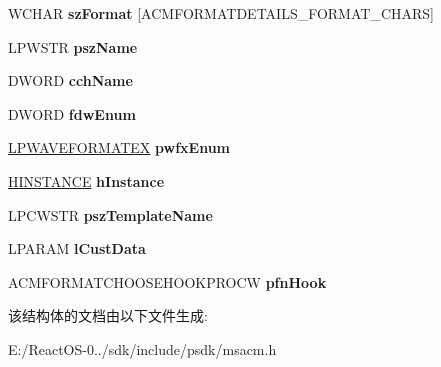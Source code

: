 \begin{DoxyCompactItemize}
\item 
\mbox{\label{struct___a_c_m_f_o_r_m_a_t_c_h_o_o_s_e_w_ac8407bab4bd26411f001b9dc2709d026}} 
W\+C\+H\+AR {\bfseries sz\+Format} \mbox{[}A\+C\+M\+F\+O\+R\+M\+A\+T\+D\+E\+T\+A\+I\+L\+S\+\_\+\+F\+O\+R\+M\+A\+T\+\_\+\+C\+H\+A\+RS\mbox{]}
\item 
\mbox{\label{struct___a_c_m_f_o_r_m_a_t_c_h_o_o_s_e_w_ac8a4c0ca80f4e1b0215f174971ca7a0c}} 
L\+P\+W\+S\+TR {\bfseries psz\+Name}
\item 
\mbox{\label{struct___a_c_m_f_o_r_m_a_t_c_h_o_o_s_e_w_a0300a30ed6baaaa1cc092c3c4b15e587}} 
D\+W\+O\+RD {\bfseries cch\+Name}
\item 
\mbox{\label{struct___a_c_m_f_o_r_m_a_t_c_h_o_o_s_e_w_a6c472a425c54b1029b259d9f210a0ca2}} 
D\+W\+O\+RD {\bfseries fdw\+Enum}
\item 
\mbox{\label{struct___a_c_m_f_o_r_m_a_t_c_h_o_o_s_e_w_a958f41f999422e0586e11bd8d8282d05}} 
\hyperlink{struct___w_a_v_e_f_o_r_m_a_t_e_x}{L\+P\+W\+A\+V\+E\+F\+O\+R\+M\+A\+T\+EX} {\bfseries pwfx\+Enum}
\item 
\mbox{\label{struct___a_c_m_f_o_r_m_a_t_c_h_o_o_s_e_w_ad017c18e8e5e0478b7ae5ab833bb7229}} 
\hyperlink{interfacevoid}{H\+I\+N\+S\+T\+A\+N\+CE} {\bfseries h\+Instance}
\item 
\mbox{\label{struct___a_c_m_f_o_r_m_a_t_c_h_o_o_s_e_w_a4aa5f1745de24a76aef8736b322cb0d5}} 
L\+P\+C\+W\+S\+TR {\bfseries psz\+Template\+Name}
\item 
\mbox{\label{struct___a_c_m_f_o_r_m_a_t_c_h_o_o_s_e_w_aefa2c8d1e0749f1786975b7645409423}} 
L\+P\+A\+R\+AM {\bfseries l\+Cust\+Data}
\item 
\mbox{\label{struct___a_c_m_f_o_r_m_a_t_c_h_o_o_s_e_w_a327705a3549a2802f4c6469c6ec6e59a}} 
A\+C\+M\+F\+O\+R\+M\+A\+T\+C\+H\+O\+O\+S\+E\+H\+O\+O\+K\+P\+R\+O\+CW {\bfseries pfn\+Hook}
\end{DoxyCompactItemize}


该结构体的文档由以下文件生成\+:\begin{DoxyCompactItemize}
\item 
E\+:/\+React\+O\+S-\/0../sdk/include/psdk/msacm.\+h\end{DoxyCompactItemize}
